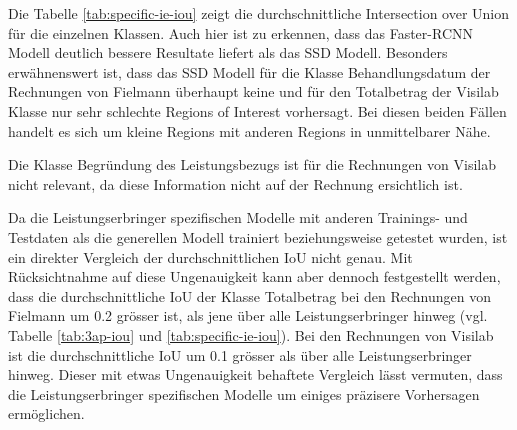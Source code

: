 Die Tabelle \ref{tab:specific-ie-iou} zeigt die durchschnittliche Intersection over Union für die einzelnen Klassen. Auch hier ist zu erkennen, dass das Faster-RCNN Modell deutlich bessere Resultate liefert als das SSD Modell. Besonders erwähnenswert ist, dass das SSD Modell für die Klasse Behandlungsdatum der Rechnungen von Fielmann überhaupt keine und für den Totalbetrag der Visilab Klasse nur sehr schlechte Regions of Interest vorhersagt. Bei diesen beiden Fällen handelt es sich um kleine Regions mit anderen Regions in unmittelbarer Nähe.

Die Klasse Begründung des Leistungsbezugs ist für die Rechnungen von Visilab nicht relevant, da diese Information nicht auf der Rechnung ersichtlich ist.

Da die Leistungserbringer spezifischen Modelle mit anderen Trainings- und Testdaten als die generellen Modell trainiert beziehungsweise getestet wurden, ist ein direkter Vergleich der durchschnittlichen IoU nicht genau. Mit Rücksichtnahme auf diese Ungenauigkeit kann aber dennoch festgestellt werden, dass die durchschnittliche IoU der Klasse Totalbetrag bei den Rechnungen von Fielmann um 0.2 grösser ist, als jene über alle Leistungserbringer hinweg (vgl. Tabelle \ref{tab:3ap-iou} und \ref{tab:specific-ie-iou}). Bei den Rechnungen von Visilab ist die durchschnittliche IoU um 0.1 grösser als über alle Leistungserbringer hinweg. Dieser mit etwas Ungenauigkeit behaftete Vergleich lässt vermuten, dass die Leistungserbringer spezifischen Modelle um einiges präzisere Vorhersagen ermöglichen.


